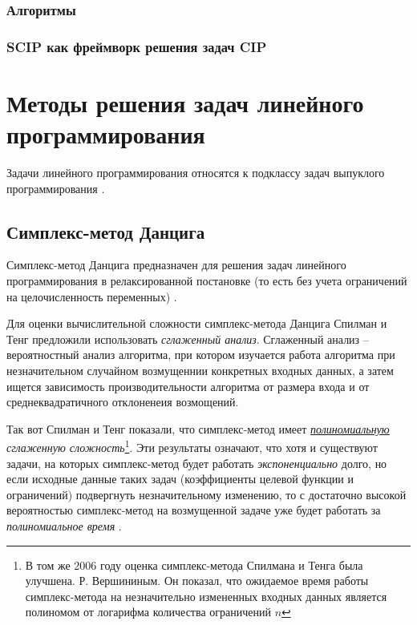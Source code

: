 \documentclass[%
	11pt,
	a4paper,
	utf8,
		]{article}
\begin{document}
\subsubsection{Алгоритмы}

\subsubsection{SCIP как фреймворк решения задач CIP}

\section{Методы решения задач линейного программирования}

Задачи линейного программирования относятся к подклассу задач выпуклого программирования \cite[]{vorontsova:convex_opt-2021}.

\subsection{Симплекс-метод Данцига}

Симплекс-метод Данцига предназначен для решения задач линейного программирования в релаксированной постановке (то есть без учета ограничений на целочисленность переменных) \cite[]{achterberg:constr_int_prog}.


Для оценки вычислительной сложности симплекс-метода Данцига Спилман и Тенг предложили использовать \emph{сглаженный анализ}. Сглаженный анализ -- вероятностный анализ алгоритма, при котором изучается работа алгоритма при незначительном случайном возмущеннии конкретных входных данных, а затем ищется зависимость производительности алгоритма от размера входа и от среднеквадратичного отклоненеия возмощений.

Так вот Спилман и Тенг показали, что симплекс-метод имеет \emph{\underline{полиномиальную} сглаженную сложность}\footnote{В том же 2006 году оценка симплекс-метода Спилмана и Тенга была улучшена. Р. Вершининым. Он показал, что ожидаемое время работы симплекс-метода на незначительно измененных входных данных является полиномом от логарифма количества ограничений $ n $}. Эти результаты означают, что хотя и существуют задачи, на которых симплекс-метод будет работать \emph{экспоненциально} долго, но если исходные данные таких задач (коэффициенты целевой функции и ограничений) подвергнуть незначительному изменению, то с достаточно высокой вероятностью симплекс-метод на возмущенной задаче уже будет работать за \emph{полиномиальное время} \cite[]{vorontsova:convex_opt-2021}.
\end{document}
